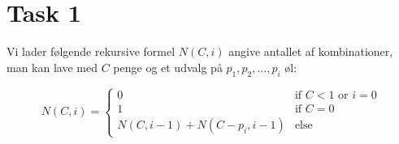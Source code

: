 \section{Task 1}

Vi lader følgende rekursive formel $N(C, i)$ angive antallet af kombinationer, man kan lave med $C$ penge og et udvalg på $p_1, p_2, ..., p_i$ øl:

$$N(C, i) = \begin{cases} 0 & \text{if } C < 1 \text{ or } i = 0 \\
  1 & \text{if } C = 0 \\
  N(C, i-1) + N(C-p_i, i-1) & \text{else }
\end{cases}
$$
